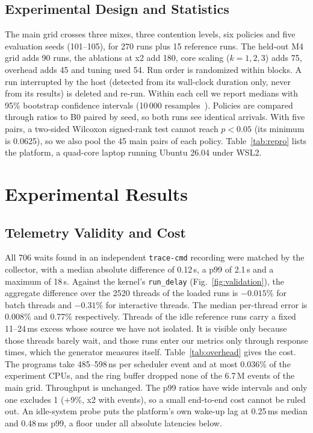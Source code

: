 \documentclass[conference]{IEEEtran}
\newcommand{\us}{\,\textmu s}
\newcommand{\ms}{\,ms}
\begin{document}
\subsection{Experimental Design and Statistics}
The main grid crosses three mixes, three contention levels, six policies and five evaluation seeds (101--105), for 270 runs plus 15 reference runs. The held-out M4 grid adds 90 runs, the ablations at x2 add 180, core scaling ($k=1,2,3$) adds 75, overhead adds 45 and tuning used 54. Run order is randomized within blocks. A run interrupted by the host (detected from its wall-clock duration only, never from its results) is deleted and re-run. Within each cell we report medians with 95\% bootstrap confidence intervals (10\,000 resamples~\cite{efron1993bootstrap}). Policies are compared through ratios to B0 paired by seed, so both runs see identical arrivals. With five pairs, a two-sided Wilcoxon signed-rank test cannot reach $p<0.05$ (its minimum is 0.0625), so we also pool the 45 main pairs of each policy. Table~\ref{tab:repro} lists the platform, a quad-core laptop running Ubuntu 26.04 under WSL2.



\section{Experimental Results}

\subsection{Telemetry Validity and Cost}
All 706 waits found in an independent \texttt{trace-cmd} recording were matched by the collector, with a median absolute difference of 0.12\us, a p99 of 2.1\us{} and a maximum of 18\us. Against the kernel's \texttt{run\_delay} (Fig.~\ref{fig:validation}), the aggregate difference over the 2520 threads of the loaded runs is $-0.015\%$ for batch threads and $-0.31\%$ for interactive threads. The median per-thread error is 0.008\% and 0.77\% respectively. Threads of the idle reference runs carry a fixed 11--24\ms{} excess whose source we have not isolated. It is visible only because those threads barely wait, and those runs enter our metrics only through response times, which the generator measures itself. Table~\ref{tab:overhead} gives the cost. The programs take 485--598\,ns per scheduler event and at most 0.036\% of the experiment CPUs, and the ring buffer dropped none of the 6.7\,M events of the main grid. Throughput is unchanged. The p99 ratios have wide intervals and only one excludes 1 (+9\%, x2 with events), so a small end-to-end cost cannot be ruled out. An idle-system probe puts the platform's own wake-up lag at 0.25\ms{} median and 0.48\ms{} p99, a floor under all absolute latencies below.
\end{document}
